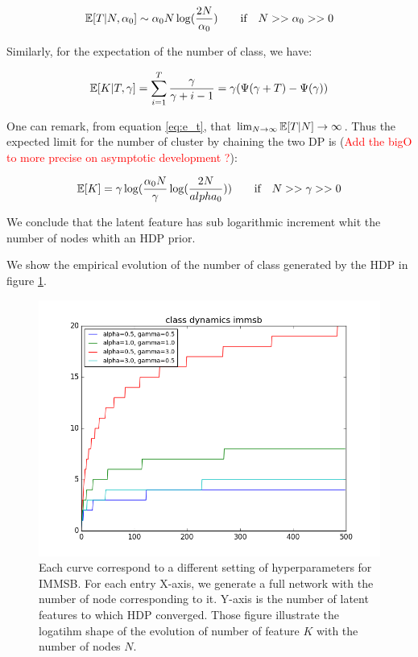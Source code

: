 \begin{equation} \label{eq:e_t}
\E[T|N, \alpha_0] \sim \alpha_0 N \log(\frac{2N}{\alpha_0}) \qquad \text{if} \quad N >> \alpha_0 >> 0
\end{equation}

Similarly, for the expectation of the number of class, we have:

\begin{equation}
\mathbb{E}[K|T, \gamma] = \sum_{i=1}^{T} \frac{\gamma}{\gamma +i-1} = \gamma (\Psi(\gamma+T) - \Psi(\gamma))
\end{equation}

One can remark, from equation \eqref{eq:e_t}, that $\lim_{N\to\infty} \mathbb{E}[T|N] \to  \infty$. Thus the expected limit for the number of cluster by chaining the two DP is (\textcolor{red}{Add the bigO to more precise on asymptotic development ?}):

\begin{equation}
\mathbb{E}[K] = \gamma \log(\frac{\alpha_0 N}{\gamma}\log(\frac{2N}{alpha_0} )) \qquad \textnormal{if} \quad N >> \gamma>>0
\end{equation}

We conclude that the latent feature has sub logarithmic increment whit the number of nodes whith an HDP prior.

We show the empirical evolution of the number of class generated by the HDP in figure \ref{fig:gen_dyn}.

\begin{figure}[h]
	\centering
	
	\includegraphics[scale=0.4]{img/class_dynamics}

	\caption{Each curve correspond to a different setting of hyperparameters for IMMSB. For each entry X-axis, we generate a full network with the number of node corresponding to it. Y-axis is the number of latent features to which HDP converged. Those figure illustrate the logatihm shape of the evolution of number of feature $K$ with the number of nodes $N$.}
	\label{fig:gen_dyn}
\end{figure}


